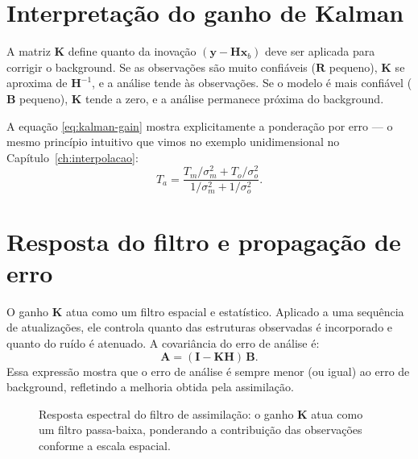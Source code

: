 \section{Interpretação do ganho de Kalman}
A matriz $\mathbf{K}$ define quanto da inovação $(\mathbf{y}-\mathbf{H}\mathbf{x}_b)$ deve ser aplicada para corrigir o background.  
Se as observações são muito confiáveis ($\mathbf{R}$ pequeno), $\mathbf{K}$ se aproxima de $\mathbf{H}^{-1}$, e a análise tende às observações.  
Se o modelo é mais confiável ($\mathbf{B}$ pequeno), $\mathbf{K}$ tende a zero, e a análise permanece próxima do background.

A equação \eqref{eq:kalman-gain} mostra explicitamente a ponderação por erro — o mesmo princípio intuitivo que vimos no exemplo unidimensional no Capítulo~\ref{ch:interpolacao}:
\[
T_a = \frac{T_m/\sigma_m^2 + T_o/\sigma_o^2}{1/\sigma_m^2 + 1/\sigma_o^2}.
\]

\section{Resposta do filtro e propagação de erro}
O ganho $\mathbf{K}$ atua como um filtro espacial e estatístico.  
Aplicado a uma sequência de atualizações, ele controla quanto das estruturas observadas é incorporado e quanto do ruído é atenuado.  
A covariância do erro de análise é:
\begin{equation}
\mathbf{A} = (\mathbf{I} - \mathbf{K}\mathbf{H})\,\mathbf{B}.
\label{eq:cov-analysis}
\end{equation}
Essa expressão mostra que o erro de análise é sempre menor (ou igual) ao erro de background, refletindo a melhoria obtida pela assimilação.

\begin{figure}[h!]
\centering
{}
\caption{Resposta espectral do filtro de assimilação: o ganho $\mathbf{K}$ atua como um filtro passa-baixa, ponderando a contribuição das observações conforme a escala espacial.}
\label{fig:kalman-filter-response}
\end{figure}

